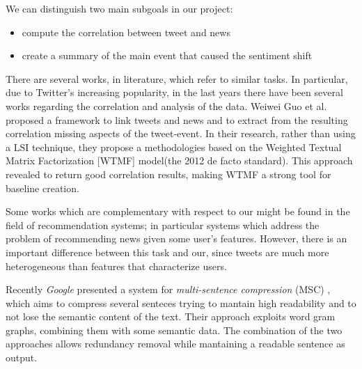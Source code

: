 We can distinguish two main subgoals in our project:
\begin{itemize}
	\item compute the correlation between tweet and news
	\item create a summary of the main event that caused the sentiment shift
\end{itemize}
There are several works, in literature, which refer to similar tasks. 
In particular, due to Twitter's increasing popularity, in the last years there
have been several works regarding the correlation and analysis of the data.
Weiwei Guo et al.\cite{LTN} proposed a framework to link tweets and news and to
extract from the resulting correlation missing aspects of the tweet-event. 
In their research, rather than using a LSI technique, they propose a
methodologies based on the Weighted Textual Matrix Factorization\cite{WTMF}
[WTMF] model(the 2012 de facto standard). This approach revealed to return
good correlation results, making WTMF a strong tool for baseline creation.

Some works which are complementary with respect to our might be found in the
field of recommendation systems; in particular systems which address the
problem of recommending news given some user's features. However, there is an
important difference between this task and our, since tweets are much more
heterogeneous than features that characterize users.

Recently \emph{Google} presented a system for \emph{multi-sentence compression} (MSC) \cite{MSC}, which aims
to compress several senteces trying to mantain high readability and to not lose
the semantic content of the text. Their approach exploits word gram graphs,
combining them with some semantic data. The combination of the two approaches
allows redundancy removal while mantaining a readable sentence as output.


